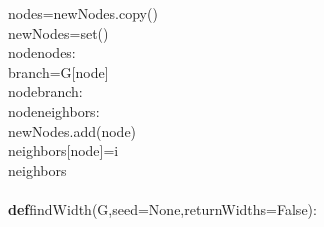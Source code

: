 {{\begin{tabbing}
\hspace{48pt}nodes\hspace{6pt}=\hspace{6pt}newNodes.copy()\\
\hspace{48pt}newNodes\hspace{6pt}=\hspace{6pt}set()\\
\hspace{6pt}node\hspace{6pt}nodes:\\
\hspace{72pt}branch\hspace{6pt}=\hspace{6pt}G{[}node{]}\\
\hspace{6pt}node\hspace{6pt}branch:\\
\hspace{6pt}node\hspace{6pt}neighbors:\\
\hspace{120pt}newNodes.add(node)\\
\hspace{120pt}neighbors{[}node{]}=i\\
\hspace{6pt}neighbors\\
\\
{\textbf{def}}\hspace{6pt}findWidth(G,seed=None,returnWidths=False):\\
\\

\end{tabbing}}}
